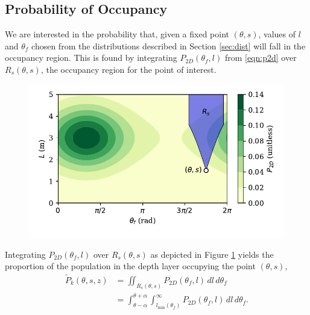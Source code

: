 \documentclass[ms,cpyr,lof,lot]{uathesis}
\begin{document}
\subsection{Probability of Occupancy}
We are interested in the probability that, given a fixed point $(\theta,s)$, values of $l$ and $\theta_f$ chosen from the distributions described in Section \ref{sec:dist} will fall in the occupancy region.
This is found by integrating $P_{2D}(\theta_f, l)$ from \eqref{eqn:p2d} over $R_s(\theta,s)$, the occupancy region for the point of interest.

\begin{figure}[h]
	\centering
	\includegraphics[width=4.5in]{cart_shade}
	\label{fig:cart_shade}
\end{figure}

Integrating $P_{2D}(\theta_f,l)$ over $R_s(\theta,s)$ as depicted in Figure \ref{fig:cart_shade} yields the proportion of the population in the depth layer occupying the point $(\theta,s)$,
\begin{align}
		\tilde{P}_k(\theta,s,z)	&= \iint_{R_s(\theta,s)}
								P_{2D}(\theta_f,l)
								\,dl\,d\theta_f \nonumber \\
							&= \int_{\theta-\alpha}^{\theta+\alpha}
								\int_{l_{\min}(\theta_f)}^\infty
								P_{2D}(\theta_f,l)
								\,dl\,d\theta_f.
                \label{eqn:integrate_p2d}
\end{align}
\end{document}
